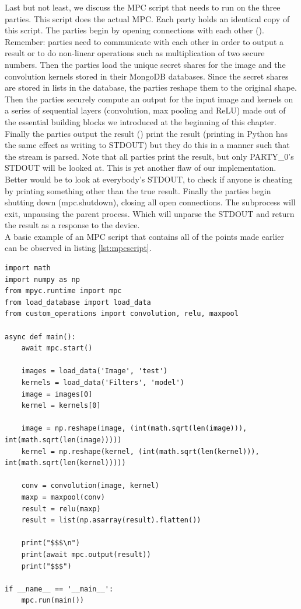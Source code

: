 Last but not least, we discuss the MPC script that needs to run on the three parties. This script does the actual MPC. Each party holds an identical copy of this script. The parties begin by opening connections with each other (). Remember: parties need to communicate with each other in order to output a result or to do non-linear operations such as multiplication of two secure numbers. Then the parties load the unique secret shares for the image and the convolution kernels stored in their MongoDB databases. Since the secret shares are stored in lists in the database, the parties reshape them to the original shape. Then the parties securely compute an output for the input image and kernels on a series of sequential layers (convolution, max pooling and ReLU) made out of the essential building blocks we introduced at the beginning of this chapter. Finally the parties output the result () print the result (printing in Python has the same effect as writing to STDOUT) but they do this in a manner such that the stream is parsed. Note that all parties print the result, but only PARTY\_0's STDOUT will be looked at. This is yet another flaw of our implementation. Better would be to look at everybody's STDOUT, to check if anyone is cheating by printing something other than the true result. Finally the parties begin shutting down (mpc.shutdown), closing all open connections. The subprocess will exit, unpausing the parent process. Which will unparse the STDOUT and return the result as a response to the device.\\

 A basic example of an MPC script that contains all of the points made earlier can be observed in listing \ref{lst:mpcscript}.

\begin{lstlisting}[caption={Example of MPC script for a single CNN layer (conv,maxp and relu)}, label={lst:mpcscript}, frame=single, breaklines=true]
import math
import numpy as np
from mpyc.runtime import mpc
from load_database import load_data
from custom_operations import convolution, relu, maxpool

async def main():
    await mpc.start()

    images = load_data('Image', 'test')
    kernels = load_data('Filters', 'model')
    image = images[0]
    kernel = kernels[0]

    image = np.reshape(image, (int(math.sqrt(len(image))), int(math.sqrt(len(image)))))
    kernel = np.reshape(kernel, (int(math.sqrt(len(kernel))), int(math.sqrt(len(kernel)))))

    conv = convolution(image, kernel)
    maxp = maxpool(conv)
    result = relu(maxp)
    result = list(np.asarray(result).flatten())

    print("$$$\n")
    print(await mpc.output(result))
    print("$$$")

if __name__ == '__main__':
    mpc.run(main())
\end{lstlisting}

